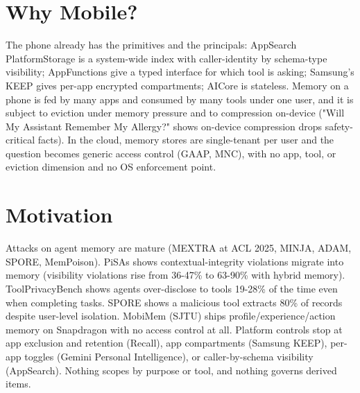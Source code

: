 \documentclass[11pt]{article}
\begin{document}
\section{Why Mobile?}
The phone already has the primitives and the principals: AppSearch PlatformStorage is a system-wide index with caller-identity by schema-type visibility; AppFunctions give a typed interface for which tool is asking; Samsung's KEEP gives per-app encrypted compartments; AICore is stateless. Memory on a phone is fed by many apps and consumed by many tools under one user, and it is subject to eviction under memory pressure and to compression on-device ("Will My Assistant Remember My Allergy?" shows on-device compression drops safety-critical facts). In the cloud, memory stores are single-tenant per user and the question becomes generic access control (GAAP, MNC), with no app, tool, or eviction dimension and no OS enforcement point.

\section{Motivation}
Attacks on agent memory are mature (MEXTRA at ACL 2025, MINJA, ADAM, SPORE, MemPoison). PiSAs shows contextual-integrity violations migrate into memory (visibility violations rise from 36-47\% to 63-90\% with hybrid memory). ToolPrivacyBench shows agents over-disclose to tools 19-28\% of the time even when completing tasks. SPORE shows a malicious tool extracts 80\% of records despite user-level isolation. MobiMem (SJTU) ships profile/experience/action memory on Snapdragon with no access control at all. Platform controls stop at app exclusion and retention (Recall), app compartments (Samsung KEEP), per-app toggles (Gemini Personal Intelligence), or caller-by-schema visibility (AppSearch). Nothing scopes by purpose or tool, and nothing governs derived items.
\end{document}

